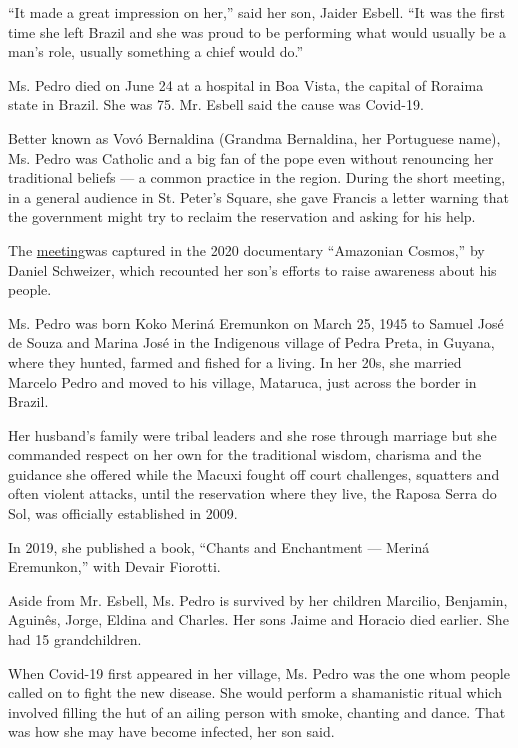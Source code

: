 ``It made a great impression on her,'' said her son, Jaider Esbell. ``It
was the first time she left Brazil and she was proud to be performing
what would usually be a man's role, usually something a chief would
do.''

Ms. Pedro died on June 24 at a hospital in Boa Vista, the capital of
Roraima state in Brazil. She was 75. Mr. Esbell said the cause was
Covid-19.

Better known as Vovó Bernaldina (Grandma Bernaldina, her Portuguese
name), Ms. Pedro was Catholic and a big fan of the pope even without
renouncing her traditional beliefs --- a common practice in the region.
During the short meeting, in a general audience in St. Peter's Square,
she gave Francis a letter warning that the government might try to
reclaim the reservation and asking for his help.

The
\href{https://www.ecoamazonia.org.br/2018/11/indigenas-macuxi-recebidos-papa-francisco/}{meeting}was
captured in the 2020 documentary ``Amazonian Cosmos,'' by Daniel
Schweizer, which recounted her son's efforts to raise awareness about
his people.

Ms. Pedro was born Koko Meriná Eremunkon on March 25, 1945 to Samuel
José de Souza and Marina José in the Indigenous village of Pedra Preta,
in Guyana, where they hunted, farmed and fished for a living. In her
20s, she married Marcelo Pedro and moved to his village, Mataruca, just
across the border in Brazil.

Her husband's family were tribal leaders and she rose through marriage
but she commanded respect on her own for the traditional wisdom,
charisma and the guidance she offered while the Macuxi fought off court
challenges, squatters and often violent attacks, until the reservation
where they live, the Raposa Serra do Sol, was officially established in
2009.

In 2019, she published a book, ``Chants and Enchantment --- Meriná
Eremunkon,'' with Devair Fiorotti.

Aside from Mr. Esbell, Ms. Pedro is survived by her children Marcilio,
Benjamin, Aguinês, Jorge, Eldina and Charles. Her sons Jaime and Horacio
died earlier. She had 15 grandchildren.

When Covid-19 first appeared in her village, Ms. Pedro was the one whom
people called on to fight the new disease. She would perform a
shamanistic ritual which involved filling the hut of an ailing person
with smoke, chanting and dance. That was how she may have become
infected, her son said.

